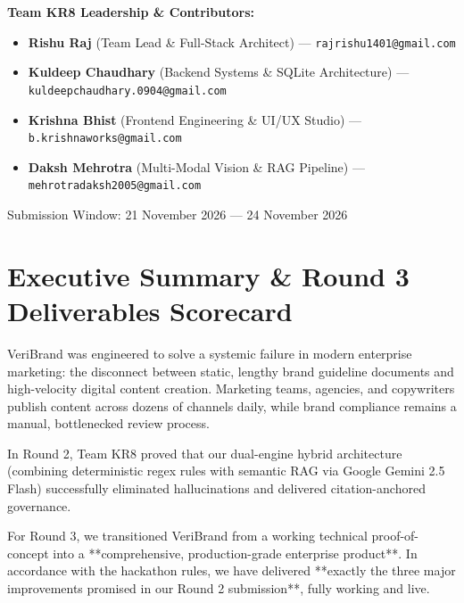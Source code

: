 \documentclass[11pt,a4paper]{article}
\begin{document}
\begin{titlepage}
    \begin{tcolorbox}[colback=white, colframe=darkgray, width=0.88\textwidth, arc=2mm, boxrule=0.5pt]
    \textbf{Team KR8 Leadership \& Contributors:}
    \begin{itemize}[leftmargin=1.5cm]
        \item \textbf{Rishu Raj} (Team Lead \& Full-Stack Architect) --- \texttt{rajrishu1401@gmail.com}
        \item \textbf{Kuldeep Chaudhary} (Backend Systems \& SQLite Architecture) --- \texttt{kuldeepchaudhary.0904@gmail.com}
        \item \textbf{Krishna Bhist} (Frontend Engineering \& UI/UX Studio) --- \texttt{b.krishnaworks@gmail.com}
        \item \textbf{Daksh Mehrotra} (Multi-Modal Vision \& RAG Pipeline) --- \texttt{mehrotradaksh2005@gmail.com}
    \end{itemize}
    \end{tcolorbox}

    \vspace{0.5cm}
    {\small Submission Window: 21 November 2026 --- 24 November 2026\par}
\end{titlepage}

\tableofcontents
\newpage

\section{Executive Summary \& Round 3 Deliverables Scorecard}

VeriBrand was engineered to solve a systemic failure in modern enterprise marketing: the disconnect between static, lengthy brand guideline documents and high-velocity digital content creation. Marketing teams, agencies, and copywriters publish content across dozens of channels daily, while brand compliance remains a manual, bottlenecked review process.

In Round 2, Team KR8 proved that our dual-engine hybrid architecture (combining deterministic regex rules with semantic RAG via Google Gemini 2.5 Flash) successfully eliminated hallucinations and delivered citation-anchored governance.

For Round 3, we transitioned VeriBrand from a working technical proof-of-concept into a **comprehensive, production-grade enterprise product**. In accordance with the hackathon rules, we have delivered **exactly the three major improvements promised in our Round 2 submission**, fully working and live.
\end{document}
